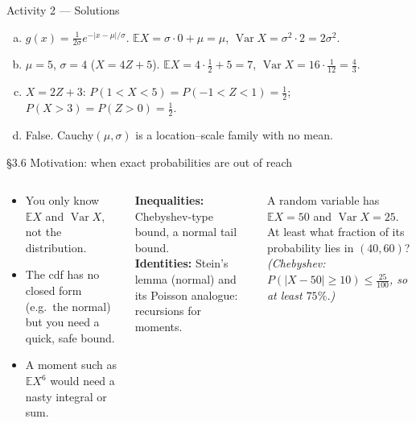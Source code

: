 \documentclass[aspectratio=169,t,10pt]{beamer}
\newcommand{\E}{\mathbb{E}}
\newcommand{\Var}{\operatorname{Var}}
\begin{document}
\begin{frame}[t]{Activity 2 --- Solutions}
  \small
  \begin{enumerate}[(a)]
    \item $g(x)=\frac1{2\sigma}e^{-|x-\mu|/\sigma}$. $\E X=\sigma\cdot0+\mu=\mu$, $\Var X=\sigma^2\cdot2=2\sigma^2$.
    \item $\mu=5$, $\sigma=4$ ($X=4Z+5$). $\E X=4\cdot\frac12+5=7$, $\Var X=16\cdot\frac1{12}=\frac43$.
    \item $X=2Z+3$: $P(1<X<5)=P(-1<Z<1)=\tfrac12$; $P(X>3)=P(Z>0)=\tfrac12$.
    \item False. Cauchy$(\mu,\sigma)$ is a location--scale family with no mean.
  \end{enumerate}
\end{frame}

\begin{frame}{\S3.6 Motivation: when exact probabilities are out of reach}
  \begin{columns}[T]
  \begin{tcolorbox}[myex={Situations}]\small
  \begin{itemize}
    \item You only know $\E X$ and $\Var X$, not the distribution.
    \item The cdf has no closed form (e.g.\ the normal) but you need a quick, safe bound.
    \item A moment such as $\E X^6$ would need a nasty integral or sum.
  \end{itemize}
  \end{tcolorbox}
  \begin{tcolorbox}[mynote={Plan}]\small
  \textbf{Inequalities:} Chebyshev-type bound, a normal tail bound.\\
  \textbf{Identities:} Stein's lemma (normal) and its Poisson analogue: recursions for moments.
  \end{tcolorbox}
  \begin{tcolorbox}[myquiz={Quick quiz}]\small
  A random variable has $\E X=50$ and $\Var X=25$. At least what fraction of its probability lies in $(40,60)$?\\[2pt]
  \emph{(Chebyshev: $P(|X-50|\ge10)\le\frac{25}{100}$, so at least $75\%$.)}
  \end{tcolorbox}
  \end{columns}
\end{frame}
\end{document}
